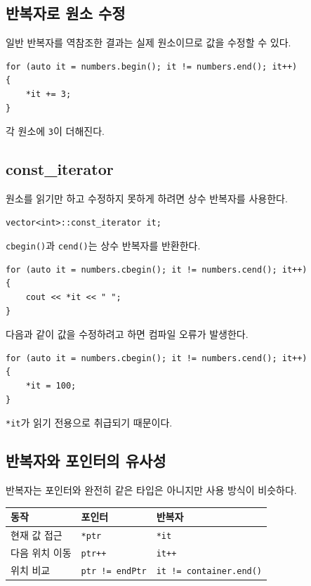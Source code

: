 \documentclass[11pt,a4paper]{article}
\begin{document}
\subsection{반복자로 원소 수정}
일반 반복자를 역참조한 결과는 실제 원소이므로 값을 수정할 수 있다.

\begin{lstlisting}
for (auto it = numbers.begin(); it != numbers.end(); it++)
{
    *it += 3;
}
\end{lstlisting}

각 원소에 \texttt{3}이 더해진다.

\subsection{const\_iterator}
원소를 읽기만 하고 수정하지 못하게 하려면 상수 반복자를 사용한다.

\begin{lstlisting}
vector<int>::const_iterator it;
\end{lstlisting}

\texttt{cbegin()}과 \texttt{cend()}는 상수 반복자를 반환한다.

\begin{lstlisting}
for (auto it = numbers.cbegin(); it != numbers.cend(); it++)
{
    cout << *it << " ";
}
\end{lstlisting}

다음과 같이 값을 수정하려고 하면 컴파일 오류가 발생한다.

\begin{lstlisting}
for (auto it = numbers.cbegin(); it != numbers.cend(); it++)
{
    *it = 100;
}
\end{lstlisting}

\texttt{*it}가 읽기 전용으로 취급되기 때문이다.

\subsection{반복자와 포인터의 유사성}
반복자는 포인터와 완전히 같은 타입은 아니지만 사용 방식이 비슷하다.

\begin{center}
\begin{tabular}{lll}
\toprule
동작 & 포인터 & 반복자 \\
\midrule
현재 값 접근 & \texttt{*ptr} & \texttt{*it} \\
다음 위치 이동 & \texttt{ptr++} & \texttt{it++} \\
위치 비교 & \texttt{ptr != endPtr} & \texttt{it != container.end()} \\
\bottomrule
\end{tabular}
\end{center}
\end{document}

